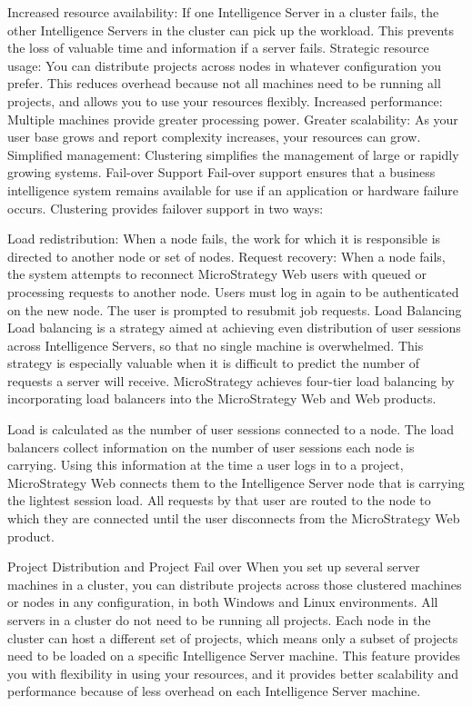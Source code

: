 \documentclass[12pt]{article}
\begin{document}
Increased resource availability: If one Intelligence Server in a cluster fails, the other Intelligence Servers in the cluster can pick up the workload. This prevents the loss of valuable time and information if a server fails.
Strategic resource usage: You can distribute projects across nodes in whatever configuration you prefer. This reduces overhead because not all machines need to be running all projects, and allows you to use your resources flexibly.
Increased performance: Multiple machines provide greater processing power.
Greater scalability: As your user base grows and report complexity increases, your resources can grow.
Simplified management: Clustering simplifies the management of large or rapidly growing systems.
Fail-over Support
Fail-over support ensures that a business intelligence system remains available for use if an application or hardware failure occurs. Clustering provides failover support in two ways:

Load redistribution: When a node fails, the work for which it is responsible is directed to another node or set of nodes.
Request recovery: When a node fails, the system attempts to reconnect MicroStrategy Web users with queued or processing requests to another node. Users must log in again to be authenticated on the new node. The user is prompted to resubmit job requests.
Load Balancing
Load balancing is a strategy aimed at achieving even distribution of user sessions across Intelligence Servers, so that no single machine is overwhelmed. This strategy is especially valuable when it is difficult to predict the number of requests a server will receive. MicroStrategy achieves four-tier load balancing by incorporating load balancers into the MicroStrategy Web and Web products.

Load is calculated as the number of user sessions connected to a node. The load balancers collect information on the number of user sessions each node is carrying. Using this information at the time a user logs in to a project, MicroStrategy Web connects them to the Intelligence Server node that is carrying the lightest session load. All requests by that user are routed to the node to which they are connected until the user disconnects from the MicroStrategy Web product.

Project Distribution and Project Fail over
When you set up several server machines in a cluster, you can distribute projects across those clustered machines or nodes in any configuration, in both Windows and Linux environments. All servers in a cluster do not need to be running all projects. Each node in the cluster can host a different set of projects, which means only a subset of projects need to be loaded on a specific Intelligence Server machine. This feature provides you with flexibility in using your resources, and it provides better scalability and performance because of less overhead on each Intelligence Server machine.
\end{document}
